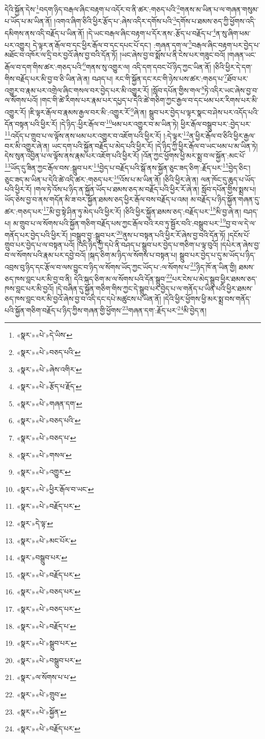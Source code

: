དེའི་སྐྱོན་དེས་\footnote{«སྣར་»«པེ་»དེ་ཡིས་}བདག་ཉིད་བརྒལ་ཞིང་བརྟག་པ་འདོར་བ་ནི་ཚར་:གཅད་པའི་\footnote{«སྣར་»«པེ་»བཅད་པའི་}གནས་མ་ཡིན་པ་ལ་གཞན་གསུམ་པ་ཡོད་པ་མ་ཡིན་ནོ། །འགའ་ཞིག་ཅིའི་ཕྱིར་རྩོད་པ་:ཞེས་འདིར་དགོས་པའི་\footnote{«སྣར་»«པེ་»ཞེས་འགིར་}དགོས་པ་ཐམས་ཅད་ཀྱི་ཕྱོགས་འདི་དམིགས་ནས་འདི་བརྗོད་པ་ཡིན་ནོ། །དེ་ཡང་བརྒལ་ཞིང་བརྟག་པ་དོར་ནས་:རྩོད་པ་བརྗོད་པ་\footnote{«སྣར་»«པེ་»རྩོད་པ་རྗོད་}ན་སུ་ཞིག་ཕམ་པར་འགྱུར། དེ་ལྟར་ན་རྒོལ་བ་དང་ཕྱིར་རྒོལ་བ་དང་དཔང་པོ་དང་། :གཞན་དག་ལ་\footnote{«སྣར་»«པེ་»གཞན་དག་}བརྒལ་ཞིང་བརྟག་པར་བྱེད་པ་མཐོང་བ་འཁོར་ལ་དྲི་བར་བྱའོ་ཞེས་བྱ་བའི་དོན་ཏོ། །ཡང་ཞེས་བྱ་བ་སྨོས་པ་ནི་ངེས་པར་གཟུང་བའོ། །གཞན་ཡང་རྒོལ་བ་དག་གིས་ཚར་:གཅད་པའི་\footnote{«སྣར་»«པེ་»བཅད་པའི་}གནས་སུ་འགྱུར་ལ། འདི་དག་དབང་པོ་ཉིད་ཀྱང་ཡིན་ནོ། །ཅིའི་ཕྱིར་དེ་དག་གིས་བརྗོད་པར་མི་བྱ་བ་ཅི་ཡིན་ཞེ་ན། བཤད་པ། རང་གི་སྐྱོན་དང་རང་གི་ཉེས་པས་ཚར་:གཅད་པ་\footnote{«སྣར་»«པེ་»བཅད་པ་}ཐོབ་པར་འགྱུར་བ་རྣམ་པར་འགྲེལ་ཞིང་གསལ་བར་བྱེད་པར་མི་འགྱུར་རོ། །སློབ་དཔོན་གྱིས་གལ་\footnote{«སྣར་»«པེ་»གསལ་}ཏེ་འདིར་ཡང་ཞེས་བྱ་བ་ལ་སོགས་པའོ། །གང་གི་ཚེ་རིགས་པར་རྣམ་པར་དཔྱད་པ་དེའི་ཚེ་གཅིག་ཀྱང་རྒྱལ་བ་དང་ཕམ་པར་རིགས་པར་མི་འགྱུར་རོ། །ཇི་ལྟར་རྒོལ་བ་རྣམས་རྒྱལ་བར་མི་:འགྱུར་རོ་\footnote{«སྣར་»«པེ་»འགྱུར་}ཞེ་ན། སྒྲུབ་པར་བྱེད་པ་ལྟར་སྣང་བ་ཤེས་པར་འདོད་པའི་དོན་བསྟན་པའི་ཕྱིར་རོ། །དེ་ཉིད་:ཕྱིར་རྒོལ་བ་\footnote{«སྣར་»«པེ་»ཕྱིར་རྒོལ་བ་ཡང་}ཕམ་པར་འགྱུར་བ་མ་ཡིན་ཏེ། ཕྱིར་རྒོལ་བསྒྲུབ་པར་:བྱེད་པར་\footnote{«སྣར་»«པེ་»བརྗོད་པར་}འདོད་པ་གྲུབ་པ་ལ་ལྟོས་ནས་ཕམ་པར་འགྱུར་བ་འཇོག་པའི་ཕྱིར་རོ། །:དེ་ལྟར་\footnote{«སྣར་»དེ་ལྟ་}ན་ཕྱིར་རྒོལ་བ་ཅིའི་ཕྱིར་རྒྱལ་བར་མི་འགྱུར་ཞེ་ན། ཡང་དག་པའི་སྐྱོན་བརྗོད་པ་མེད་པའི་ཕྱིར་རོ། །དེ་ཉིད་ཀྱི་ཕྱིར་རྒོལ་བ་ཡང་ཕམ་པ་མ་ཡིན་ཏེ། དེས་སུན་འབྱིན་པ་ལ་ལྟོས་ནས་རྣམ་པར་འཇོག་པའི་ཕྱིར་རོ། །འོན་ཀྱང་ཕྱོགས་ཕྱི་མར་སྨྲ་བ་ལ་སྐྱོན་:མང་པོ་\footnote{«སྣར་»«པེ་»མང་པོར་}ཡོད་དུ་ཟིན་ཀྱང་རྒོལ་བས་:སྒྲུབ་པར་\footnote{«སྣར་»བསྒྲུབ་པར་}བྱེད་པ་བརྗོད་པའི་སྒོ་ནས་སྐྱོན་ཅུང་ཟད་ཅིག་:རྗོད་པར་\footnote{«སྣར་»«པེ་»བརྗོད་པར་}བྱེད་ཅིང་། ཅུང་ཟད་མ་ཡིན་པ་དེའི་ཚེ་འདི་ཚར་:གཅད་པར་\footnote{«སྣར་»«པེ་»བཅད་པར་}འོས་པ་མ་ཡིན་ནོ། །ཅིའི་ཕྱིར་ཞེ་ན། ལན་ཁོང་དུ་ཆུད་པ་ཡོད་པའི་ཕྱིར་རོ། །གལ་ཏེ་འོས་པ་ཉིད་ན་སྐྱོན་ཡོད་པ་ཐམས་ཅད་མ་བརྗོད་པའི་ཕྱིར་རོ་ཞེ་ན། སློབ་དཔོན་གྱིས་སྨྲས་པ། ཡོད་ཅེས་བྱ་བ་ནས་གདོན་མི་ཟ་བར་སྐྱོན་ཐམས་ཅད་ཕྱིར་རྒོལ་བས་བརྗོད་པ་འམ། མ་བརྗོད་པ་ཉིད་སྐྱོན་གཞན་དུ་ཚར་:གཅད་པར་\footnote{«སྣར་»«པེ་»བཅད་པར་}མི་བྱ་སྟེ་ཤིན་ཏུ་མེད་པའི་ཕྱིར་རོ། །ཅིའི་ཕྱིར་སྐྱོན་ཐམས་ཅད་:བརྗོད་པར་\footnote{«སྣར་»«པེ་»བརྗོད་པ་}མི་བྱ་ཞེ་ན། བཤད་པ། མ་གྲུབ་པ་ལ་སོགས་པའི་སྐྱོན་གཅིག་བརྗོད་པས་ཀྱང་རྒོལ་བའི་རབ་ཏུ་སྦྱོར་བའི་:བསྒྲུབ་པར་\footnote{«སྣར་»«པེ་»སྒྲུབ་པར་}བྱ་བ་ལ་དེ་ལ་གནོད་པར་བྱེད་པའི་ཕྱིར་རོ། །བསྒྲུབ་བྱ་:སྒྲུབ་པར་\footnote{«སྣར་»«པེ་»བསྒྲུབ་པར་}ནུས་པ་བསྟན་པའི་ཕྱིར་རོ་ཞེས་བྱ་བའི་དོན་ཏོ། །དངོས་པོ་གྲུབ་པར་བྱེད་པ་ལ་བསྟན་པའོ། །འདི་ཉིད་ཀྱི་དཔེ་ནི་བཤད་པ་སྒྲུབ་པར་བྱེད་པ་གཅིག་པ་ལྟ་བུའོ། །དཔེར་ན་ཞེས་བྱ་བ་ལ་སོགས་པའི་རྣམ་པར་དབྱེ་བའོ། །སྐད་ཅིག་མ་ཉིད་ལ་སོགས་པ་བསྟན་པ། སྒྲུབ་པར་བྱེད་པ་དུ་མ་ཡོད་པ་ཉིད་འབྲས་བུ་ཉིད་དང་རྩོལ་བ་ལས་བྱུང་བ་ཉིད་ལ་སོགས་ཡོད་ཀྱང་ཡོད་པ་:ལ་སོགས་པ་\footnote{«སྣར་»ལ་སོགས་པ་པ་}ཉིད་ཁོ་ན་ཡིན་གྱི། ཐམས་ཅད་ཁས་བླང་པར་མི་བྱ་བ་ནི། དེའི་སྐད་ཅིག་མ་ལ་སོགས་པའི་དོན་སྒྲུབ་\footnote{«སྣར་»«པེ་»གྲུབ་}པར་ངེས་པ་མེད་སྒྲུབ་ཕྱིར་ཐམས་ཅད་ཁས་བླང་པར་མི་བྱའོ། །དེ་བཞིན་དུ་སྐྱོན་གཅིག་གིས་ཀྱང་དེ་སྒྲུབ་པར་བྱེད་པ་ལ་གནོད་པ་ཡིན་པའི་ཕྱིར་ཐམས་ཅད་ཁས་བླང་བར་མི་བྱའོ་ཞེས་བྱ་བ་འདི་དང་དཔེ་མཚུངས་པ་ཡིན་ནོ། །དེའི་ཕྱིར་ཕྱོགས་ཕྱི་མར་སྨྲ་བས་གནོད་པའི་སྐྱོན་གཅིག་བརྗོད་པ་ཉིད་ཀྱིས་གཞན་གྱི་ཕྱོགས་\footnote{«སྣར་»«པེ་»སྐྱོན་}གཞན་དག་:རྗོད་པར་\footnote{«སྣར་»«པེ་»བརྗོད་པར་}མི་བྱེད་ན། 